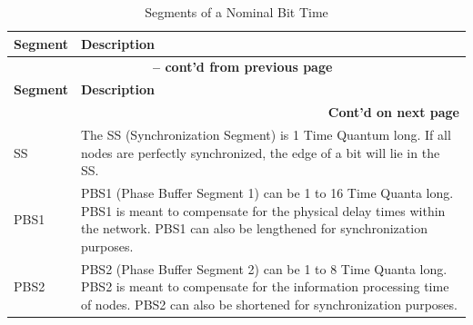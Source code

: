 \begin{longtable}[c]{|p{2.5cm}|p{13cm}|} 
    
  \caption{Segments of a Nominal Bit Time}
  \label{tab:twai-seg-of-a-nominal-bit-time} 
  \\\hline
  \rowcolor{lightgray}
  \textbf{Segment} & \textbf{Description}
  \\\hline
  \endfirsthead
  
  \multicolumn{2}{c}{\bfseries \tablename\ \thetable{} -- cont'd from previous page}\\\hline
 
  \rowcolor{lightgray}
    \textbf{Segment} & \textbf{Description}\\\hline
  \endhead
  \multicolumn{2}{r}{\textbf{Cont'd on next page}} \\
  \endfoot
  \hline
  \endlastfoot

    SS & The SS (Synchronization Segment) is 1 Time Quantum long. If all nodes are perfectly synchronized, the edge of a bit will lie in the SS.
            \\\hline
    PBS1 & PBS1 (Phase Buffer Segment 1) can be 1 to 16 Time Quanta long. PBS1 is meant to compensate for the physical delay times within the network. PBS1 can also be lengthened for synchronization purposes.
            \\\hline
    PBS2 & PBS2 (Phase Buffer Segment 2) can be 1 to 8 Time Quanta long. PBS2 is meant to compensate for the information processing time of nodes. PBS2 can also be shortened for synchronization purposes.
            \\\hline
    
\end{longtable}
